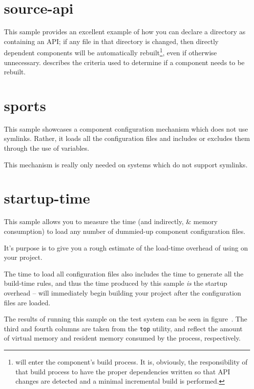 \section{source-api}

This sample provides an excellent example of how you can declare a
\destdir directory as containing an API; if any file in that directory is
changed, then directly dependent components will be automatically
rebuilt\footnote{\lmsbw will enter the component's build process.  It
  is, obviously, the responsibility of that build process to have the
  proper dependencies written so that API changes are detected and a
  minimal incremental build is performed.}, even if otherwise unnecessary.
 describes the criteria used to
determine if a component needs to be rebuilt.

\section{sports}\label{samples:sports}

This sample showcases a component configuration mechanism which does
not use symlinks.  Rather, it loads all the configuration files and
includes or excludes them through the use of \make variables.

This mechanism is really only needed on systems which do not support
symlinks.

\section{startup-time}\label{samples:startup-time}

This sample allows you to measure the time (and indirectly, \lmsbw \&
\make memory consumption) to load any number of dummied-up component
configuration files.

It's purpose is to give you a rough estimate of the load-time overhead
of using \lmsbw on your project.

The time to load all configuration files also includes the time to
generate all the build-time \make rules, and thus the time produced by
this sample \emph{is} the startup overhead -- \make will immediately
begin building your project after the configuration files are loaded.

The results of running this sample on the test system can be seen in
figure~.  The third and fourth
columns are taken from the \texttt{top} utility, and reflect the
amount of virtual memory and resident memory consumed by the process,
respectively.

